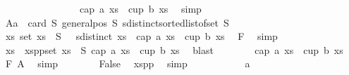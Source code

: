 \begin{isabellebody}
\ \ \ \ \ \ \ \ \ \ \ \ \ \ {\isasymlongrightarrow}\ {\isasymnot}\ {\isacharparenleft}{\kern0pt}cap\ a\ xs\ {\isasymor}\ cup\ b\ xs{\isacharparenright}{\kern0pt}{\isachardoublequoteclose}\ \isamarkupfalse%
\ simp\isanewline
\ \ \ \ \isamarkupfalse%
\isanewline
\ \ \ \ \isakeywordONE{{\isacharbraceleft}{\kern0pt}}\isamarkupfalse%
\isanewline
\ \ \ \ \ \ \isamarkupfalse%
\ A{}{\isacharcolon}{\kern0pt}{\isachardoublequoteopen}a{\isacharminus}{\kern0pt}{}\ {\isacharequal}{\kern0pt}\ card\ S{\isachardoublequoteclose}\ {\isachardoublequoteopen}general{\isacharunderscore}{\kern0pt}pos\ S{\isachardoublequoteclose}\ {\isachardoublequoteopen}sdistinct{\isacharparenleft}{\kern0pt}sorted{\isacharunderscore}{\kern0pt}list{\isacharunderscore}{\kern0pt}of{\isacharunderscore}{\kern0pt}set\ S{\isacharparenright}{\kern0pt}{\isachardoublequoteclose}\isanewline
\ \ \ \ \ \ \isamarkupfalse%
\ {\isachardoublequoteopen}{\isacharparenleft}{\kern0pt}{\isasymexists}xs{\isachardot}{\kern0pt}\ set\ xs\ {\isasymsubseteq}\ S\ \ {\isasymand}\ sdistinct\ xs\ {\isasymand}\ {\isacharparenleft}{\kern0pt}cap\ a\ xs\ {\isasymor}\ cup\ b\ xs{\isacharparenright}{\kern0pt}{\isacharparenright}{\kern0pt}{\isachardoublequoteclose}\ \isamarkupfalse%
\ F{}\ \isamarkupfalse%
\ simp\isanewline
\ \ \ \ \ \ \isamarkupfalse%
\ \isamarkupfalse%
\ xs\ \ xspp{\isacharcolon}{\kern0pt}{\isachardoublequoteopen}set\ xs\ {\isasymsubseteq}\ S{\isachardoublequoteclose}\ {\isachardoublequoteopen}{\isacharparenleft}{\kern0pt}cap\ a\ xs\ {\isasymor}\ cup\ b\ xs{\isacharparenright}{\kern0pt}{\isachardoublequoteclose}\ \isamarkupfalse%
\ blast\isanewline
\ \ \ \ \ \ \isamarkupfalse%
\ {\isachardoublequoteopen}{\isasymnot}{\isacharparenleft}{\kern0pt}cap\ a\ xs\ {\isasymor}\ cup\ b\ xs{\isacharparenright}{\kern0pt}{\isachardoublequoteclose}\ \isamarkupfalse%
\ F{}\ A{}\ \isamarkupfalse%
\ simp\isanewline
\ \ \ \ \ \ \isamarkupfalse%
\ False\ \isamarkupfalse%
\ xspp\ \isamarkupfalse%
\ simp\isanewline
\ \ \ \ \isakeywordONE{{\isacharbraceright}{\kern0pt}}\isamarkupfalse%
\isanewline
\ \ \isakeywordONE{{\isacharbraceright}{\kern0pt}}\isamarkupfalse%
\isanewline
\ \ \isamarkupfalse%
\ {\isachardoublequoteopen}a\ {\isacharminus}{\kern0pt}\ {}\isanewline

\end{isabellebody}
